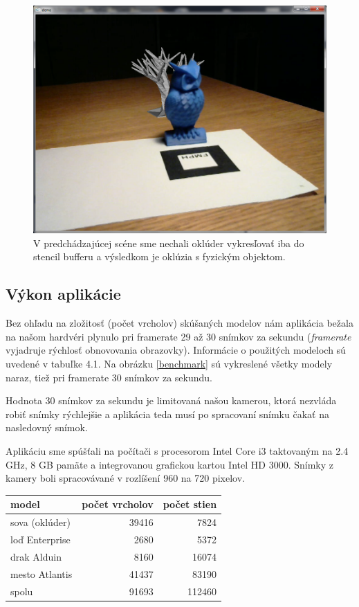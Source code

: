 \begin{figure}[h]
 \centering
 \includegraphics[max width=\textwidth]{pictures/screenshot-occlusion.png}
 \caption{V predchádzajúcej scéne sme nechali oklúder vykresľovať iba do stencil bufferu a výsledkom je oklúzia s fyzickým objektom.}
 \label{true-occlusion}
 \end{figure}
 
 \subsection{Výkon aplikácie}
 
 Bez ohľadu na zložitosť (počet vrcholov) skúšaných modelov nám aplikácia bežala na našom hardvéri plynulo pri framerate 29 až 30 snímkov za sekundu (\emph{framerate} vyjadruje rýchlosť obnovovania obrazovky). Informácie o použitých modeloch sú uvedené v tabuľke 4.1. Na obrázku \ref{benchmark} sú vykreslené všetky modely naraz, tiež pri framerate 30 snímkov za sekundu.
  
 Hodnota 30 snímkov za sekundu je limitovaná našou kamerou, ktorá nezvláda robiť snímky rýchlejšie a aplikácia teda musí po spracovaní snímku čakať na nasledovný snímok.
 
 Aplikáciu sme spúšťali na počítači s procesorom Intel Core i3 taktovaným na 2.4 GHz, 8 GB pamäte a integrovanou grafickou kartou Intel HD 3000. Snímky z kamery boli spracovávané v rozlíšení 960 na 720 pixelov.
 
 \begin{center}
   \begin{tabular}{| l | r | r |}
     \hline
     model &  počet vrcholov &  počet stien \\ \hline\hline
     sova (oklúder) & 39416 & 7824 \\ \hline
     loď Enterprise & 2680 & 5372 \\ \hline
     drak Alduin & 8160 & 16074 \\ \hline
     mesto Atlantis & 41437 & 83190 \\ \hline \hline
     spolu & 91693 & 112460 \\ \hline
   \end{tabular}
 \end{center}
 
